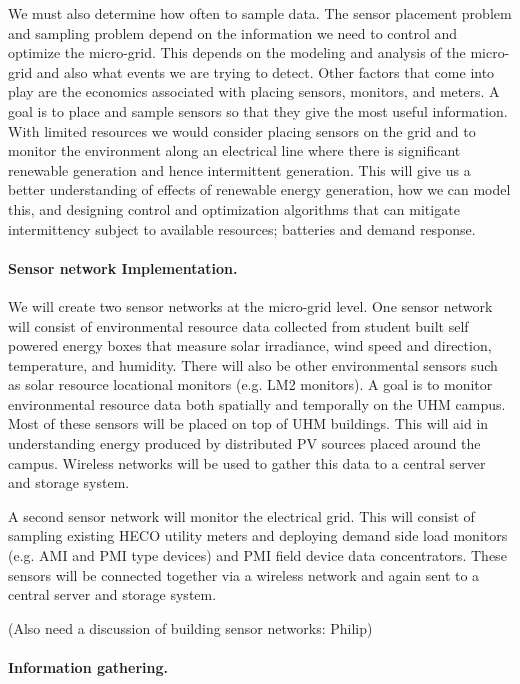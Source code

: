 We must also determine how often to sample data.    The sensor placement problem and sampling 
problem depend on the information we need to control and optimize the micro-grid.  This
depends on the modeling and analysis of the micro-grid and also what events we are trying
to detect.  Other factors that come into play are the economics associated with placing sensors,
monitors, and meters.  A goal is to place and sample sensors so that they give the most
useful information.    With limited resources we would consider placing sensors on the
grid and to monitor the environment along an electrical line where there is significant
renewable generation and hence intermittent generation.  This will give us a better understanding
of effects of renewable energy generation, how we can model this, and designing control
and optimization algorithms that can mitigate intermittency subject to available resources;
batteries and demand response.

 
\paragraph{Sensor network Implementation.}

We will create two sensor networks at the micro-grid level.  One sensor
network will consist of environmental resource data collected from student
built self powered energy boxes that measure solar irradiance, wind speed
and direction, temperature, and humidity.  There will also be other
environmental sensors such as solar resource locational monitors (e.g. LM2
monitors).  A goal is to monitor environmental resource data both spatially
and temporally on the UHM campus.  Most of these sensors will be placed on
top of UHM buildings.  This will aid in understanding energy produced by
distributed PV sources placed around the campus.  Wireless networks will be
used to gather this data to a central server and storage system.

A second sensor network will monitor the electrical grid.  This will
consist of sampling existing HECO utility meters and deploying demand side
load monitors (e.g.  AMI and PMI type devices) and PMI field device data
concentrators.  These sensors will be connected together via a wireless
network and again sent to a central server and storage system.

(Also need a discussion of building sensor networks: Philip)

\paragraph{Information gathering.}

